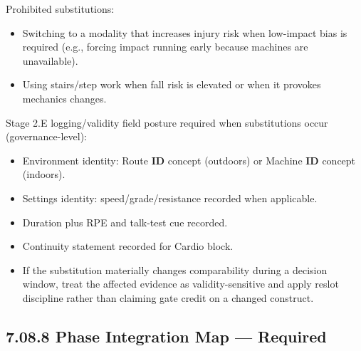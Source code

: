 \documentclass[10pt]{article}
\begin{document}
Prohibited substitutions:

\begin{itemize}
\item Switching to a modality that increases injury risk when low-impact bias is required (e.g., forcing impact running early because machines are unavailable).
\item Using stairs/step work when fall risk is elevated or when it provokes mechanics changes.
\end{itemize}

Stage 2.E logging/validity field posture required when substitutions occur (governance-level):

\begin{itemize}
\item Environment identity: Route \textbf{ID} concept (outdoors) or Machine \textbf{ID} concept (indoors).
\item Settings identity: speed/grade/resistance recorded when applicable.
\item Duration plus RPE and talk-test cue recorded.
\item Continuity statement recorded for Cardio block.
\item If the substitution materially changes comparability during a decision window, treat the affected evidence as validity-sensitive and apply reslot discipline rather than claiming gate credit on a changed construct.
\end{itemize}

\subsection*{7.08.8 Phase Integration Map — Required}
{}

\begingroup
\scriptsize
\setlength{\tabcolsep}{2pt}
\renewcommand{\arraystretch}{1.12}
\end{document}
